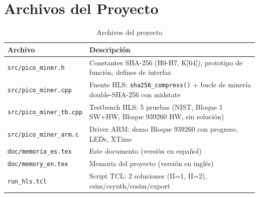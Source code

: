\documentclass[12pt,a4paper]{article}
\begin{document}
\section{Archivos del Proyecto}

\begin{table}[h]
    \centering
    \caption{Archivos del proyecto}
    \begin{tabular}{@{}lp{9cm}@{}}
        \toprule
        \textbf{Archivo} & \textbf{Descripci\'on} \\
        \midrule
        \texttt{src/pico\_miner.h}      & Constantes SHA-256 (H0-H7, K[64]), prototipo de funci\'on, defines de interfaz \\
        \texttt{src/pico\_miner.cpp}    & Fuente HLS: \texttt{sha256\_compress()} + bucle de miner\'ia double-SHA-256 con midstate \\
        \texttt{src/pico\_miner\_tb.cpp} & Testbench HLS: 5 pruebas (NIST, Bloque 1 SW+HW, Bloque 939260 HW, sin soluci\'on) \\
        \texttt{src/pico\_miner\_arm.c}  & Driver ARM: demo Bloque 939260 con progreso, LEDs, XTime \\
        \texttt{doc/memoria\_es.tex}    & Este documento (versi\'on en espa\~nol) \\
        \texttt{doc/memory\_en.tex}     & Memoria del proyecto (versi\'on en ingl\'es) \\
        \texttt{run\_hls.tcl}           & Script TCL: 2 soluciones (II=1, II=2), csim/csynth/cosim/export \\
        \bottomrule
    \end{tabular}
\end{table}

\end{document}
